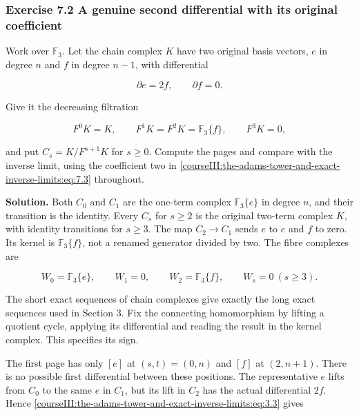 \subsubsection{Exercise 7.2 A genuine second differential with its original coefficient}
\label{courseIII:the-adams-tower-and-exact-inverse-limits:exercise-7.2}

\label{courseIII:adams-tower:7.2}

Work over \(\mathbb F_3\). Let the chain complex \(K\) have two original basis vectors, \(e\) in degree \(n\) and \(f\) in degree \(n-1\), with differential

\begin{equation}
\partial e=2f,\qquad \partial f=0.
 \label{courseIII:the-adams-tower-and-exact-inverse-limits:eq:7.3}
\end{equation}

Give it the decreasing filtration

\begin{equation}
F^0K=K,\qquad F^1K=F^2K=\mathbb F_3\{f\},
 \qquad F^3K=0,
 \label{courseIII:the-adams-tower-and-exact-inverse-limits:eq:7.4}
\end{equation}

and put \(C_s=K/F^{s+1}K\) for \(s\geq0\). Compute the pages and compare with the inverse limit, using the coefficient two in \eqref{courseIII:the-adams-tower-and-exact-inverse-limits:eq:7.3} throughout.

\textbf{Solution.} Both \(C_0\) and \(C_1\) are the one-term complex \(\mathbb F_3\{e\}\) in degree \(n\), and their transition is the identity. Every \(C_s\) for \(s\geq2\) is the original two-term complex \(K\), with identity transitions for \(s\geq3\). The map \(C_2\to C_1\) sends \(e\) to \(e\) and \(f\) to zero. Its kernel is \(\mathbb F_3\{f\}\), not a renamed generator divided by two. The fibre complexes are

\begin{equation}
W_0=\mathbb F_3\{e\},\qquad W_1=0,
 \qquad W_2=\mathbb F_3\{f\},\qquad W_s=0\ (s\geq3).
 \label{courseIII:the-adams-tower-and-exact-inverse-limits:eq:7.5}
\end{equation}

The short exact sequences of chain complexes give exactly the long exact sequences used in Section 3. Fix the connecting homomorphism by lifting a quotient cycle, applying its differential and reading the result in the kernel complex. This specifies its sign.

The first page has only \([e]\) at \((s,t)=(0,n)\) and \([f]\) at \((2,n+1)\). There is no possible first differential between these positions. The representative \(e\) lifts from \(C_0\) to the same \(e\) in \(C_1\), but its lift in \(C_2\) has the actual differential \(2f\). Hence \eqref{courseIII:the-adams-tower-and-exact-inverse-limits:eq:3.3} gives

